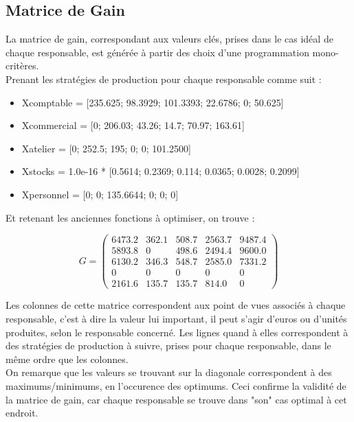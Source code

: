 \subsection{Matrice de Gain}

La matrice de gain, correspondant aux valeurs clés, prises dans le cas
idéal de chaque responsable, est générée à partir des choix d'une
programmation mono-critères. \\

Prenant les stratégies de production pour chaque responsable comme suit :

\begin{itemize}
    \item Xcomptable = [235.625; 98.3929; 101.3393; 22.6786; 0; 50.625]
    \item Xcommercial = [0; 206.03; 43.26; 14.7; 70.97; 163.61]
    \item Xatelier = [0; 252.5; 195; 0; 0; 101.2500]
    \item Xstocks = 1.0e-16 * [0.5614; 0.2369; 0.114; 0.0365; 0.0028; 0.2099]
    \item Xpersonnel = [0; 0; 135.6644; 0; 0; 0]
\end{itemize}

Et retenant les anciennes fonctions à optimiser, on trouve :

$$
G =
\left (
    \begin{array}{ccccc}
        6473.2 & 362.1 & 508.7 & 2563.7 & 9487.4 \\
        5893.8 &     0 & 498.6 & 2494.4 & 9600.0 \\
        6130.2 & 346.3 & 548.7 & 2585.0 & 7331.2 \\
        0 &     0 &     0 &      0 &      0 \\
        2161.6 & 135.7 & 135.7 &  814.0 &      0
    \end{array}
\right )
$$

Les colonnes de cette matrice correspondent aux point de vues associés à chaque
responsable, c'est à dire la valeur lui important, il peut s'agir d'euros ou
d'unités produites, selon le responsable concerné. Les lignes quand à elles
correspondent à des stratégies de production à suivre, prises pour chaque
responsable, dans le même ordre que les colonnes. \\

On remarque que les valeurs se trouvant sur la diagonale correspondent à des
maximums/minimums, en l'occurence des optimums. Ceci confirme la validité de
la matrice de gain, car chaque responsable se trouve dans "son" cas optimal
à cet endroit.

